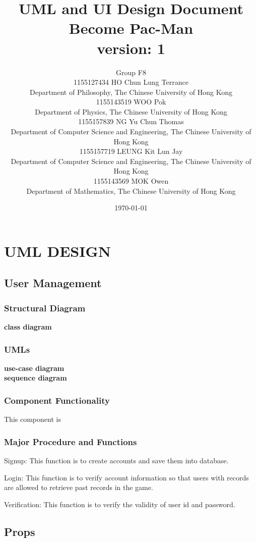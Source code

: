 \documentclass[11pt]{article}
\title{UML and UI Design Document\\Become Pac-Man\\version: 1}
\author{Group F8\\1155127434 HO Chun Lung Terrance\\
Department of Philosophy, The Chinese University of Hong Kong\\1155143519 WOO Pok\\
Department of Physics, The Chinese University of Hong Kong\\1155157839 NG Yu Chun Thomas\\
Department of Computer Science and Engineering, The Chinese University of Hong Kong\\1155157719 LEUNG Kit Lun Jay\\
Department of Computer Science and Engineering, The Chinese University of Hong Kong\\1155143569 MOK Owen\\
Department of Mathematics, The Chinese University of Hong Kong}
\date{\today}
\begin{document}
\maketitle
\tableofcontents
\newpage
\section{UML DESIGN}

\subsection{User Management}
\subsubsection{Structural Diagram}
\textbf{class diagram}\\
\subsubsection{UMLs}
\textbf{use-case diagram}\\
\textbf{sequence diagram}\\
\subsubsection{Component Functionality}
This component is 
\subsubsection{Major Procedure and Functions}
Signup: This function is to create accounts and save them into database.

Login: This function is to verify account information so that users with records are allowed to retrieve past records in the game.

Verification: This function is to verify the validity of user id and password.

\subsection{Props}
\end{document}
